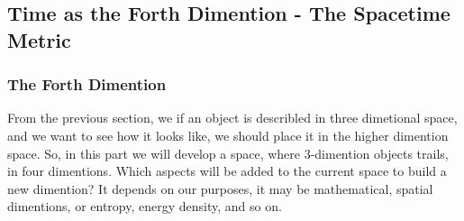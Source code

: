\documentclass[11pt,a4paper]{article}
\begin{document}
	\subsection{Time as the Forth Dimention - The Spacetime Metric}
	\subsubsection{The Forth Dimention}
	From the previous section, we if an object is describled in three dimetional space, and we want to see how it looks like, we should place it in the higher dimention space. So, in this part we will develop a space, where 3-dimention objects trails, in four dimentions. Which aspects will be added to the current space to build  a new dimention? It depends on our purposes, it may be mathematical, spatial dimentions, or entropy, energy density, and so on.
	 
\end{document}
